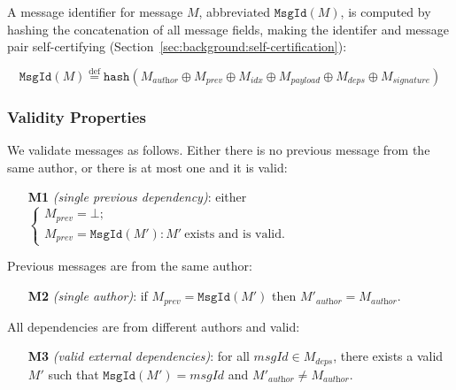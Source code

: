 \documentclass[9pt, oneside]{article}   	%
\newcommand{\defeq}{\overset{\mathrm{def}}{=}}
\begin{document}
A message identifier for message $M$, abbreviated $\texttt{MsgId}(M)$, is computed by hashing the concatenation of all message fields, making the identifer and message pair self-certifying (Section~\ref{sec:background:self-certification}):

\begin{equation*}
\texttt{MsgId}(M) \defeq \texttt{hash}(M_{\textit{author}} \oplus M_{\textit{prev}} \oplus M_{\textit{idx}} \oplus M_{\textit{payload}} \oplus M_{\textit{deps}} \oplus M_{\textit{signature}})
\end{equation*}

\subsubsection{Validity Properties}
\label{sec:design:message:valid}

We validate messages as follows. Either there is no previous message from the same author, or there is at most one and it is valid: 

\begin{tcolorbox}
\begin{enumerate}
	\item[\textbf{M1}] \textit{(single previous dependency)}: either $\begin{cases}
		M_\textit{prev} = \bot; \\
		M_\textit{prev} = \texttt{MsgId}(M') : M' ~\text{exists and is valid}.
		\end{cases}$ \\
\end{enumerate}
\end{tcolorbox}


Previous messages are from the same author:
\begin{tcolorbox}
\begin{enumerate}
	\item[\textbf{M2}] \textit{(single author)}: if $M_\textit{prev} = \texttt{MsgId}(M')$ then $M'_\textit{author} = M_\textit{author}$.
\end{enumerate}
\end{tcolorbox}

All dependencies are from different authors and valid:
\begin{tcolorbox}
\begin{enumerate}
	\item[\textbf{M3}] \textit{(valid external dependencies)}: for all $\textit{msgId} \in M_\textit{deps}$, there exists a valid $M'$ such that $\texttt{MsgId}(M') = \textit{msgId}$ and $M'_\textit{author} \neq M_\textit{author}$.
\end{enumerate}
\end{tcolorbox}
\end{document}
